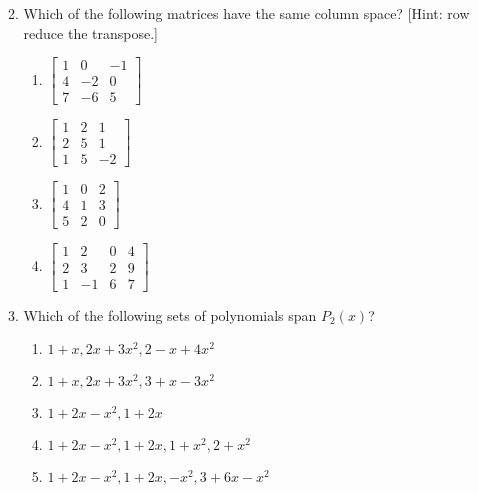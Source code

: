 \begin{enumerate}
\begin{enumerate}
\begin{multicols}{4}
\begin{enumerate}
\end{enumerate}
\end{multicols}


	\item Which of the following matrices have the same column space? [Hint: row reduce the transpose.]
\begin{multicols}{4}
\begin{enumerate}
	\item 
	$\begin{bmatrix}
 1 & 0 & -1 \\
 4 & -2 & 0 \\
 7 & -6 & 5
 	\end{bmatrix}$

	\item 
	$\begin{bmatrix}
 1 & 2 & 1 \\
 2 & 5 & 1 \\
 1 & 5 & -2
	\end{bmatrix}$

	\item 
	$\begin{bmatrix}
 1 & 0 & 2 \\
 4 & 1 & 3 \\
 5 & 2 & 0
	\end{bmatrix}$

	\item 
	$\begin{bmatrix}
 1 & 2 & 0 & 4 \\
 2 & 3 & 2 & 9 \\
 1 & -1 & 6 & 7
	\end{bmatrix}$

\end{enumerate}
\end{multicols}

	\item Which of the following sets of polynomials span $P_2(x)$?
\begin{multicols}{2}
		\begin{enumerate}
			\item $1 + x, 2 x + 3 x^2, 2 - x + 4 x^2$ 
			\item ${1 + x, 2 x + 3 x^2, 3 + x - 3 x^2}$ 
			\item $1 + 2 x - x^2, 1 + 2 x$ 
			\item ${1 + 2 x - x^2, 1 + 2 x, 1 + x^2, 2 + x^2}$ 
			\item $1 + 2 x - x^2, 1 + 2 x, -x^2, 3 + 6 x - x^2$ 
		\end{enumerate}
\end{multicols}


\end{enumerate}
\end{enumerate}
